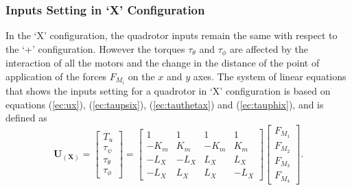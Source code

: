 \subsubsection{Inputs Setting in `X' Configuration}
In the `X' configuration, the quadrotor inputs remain the same with respect to the `+' configuration. However the torques $\tau_\theta$ and $\tau_\phi$ are affected by the interaction of all the motors and the change in the distance of the point of application of the forces $F_{M_i}$ on the $x$ and $y$ axes. The system of linear equations that shows the inputs setting for a quadrotor in `X' configuration is based on equations (\ref{ec:ux}), (\ref{ec:taupsix}), (\ref{ec:tauthetax}) and (\ref{ec:tauphix}), and is defined as
\begin{equation}
	\mathbf{U_{(X)}} = \begin{bmatrix}
	T_u\\[5pt]
	\tau_{\psi}\\[5pt]
	\tau_{\theta}\\[5pt]
	\tau_{\phi}
	\end{bmatrix} = \begin{bmatrix}
	1 & 1 & 1 & 1 \\[5pt]
	-K_{m} & K_{m} & -K_{m} & K_{m}\\[5pt]
	-L_{X} & -L_{X} & L_{X} & L_{X}\\[5pt]
	-L_{X} & L_{X} & L_{X} & -L_{X}
							\end{bmatrix}
\begin{bmatrix}
F_{M_1}\\[5pt]
F_{M_2}\\[5pt]
F_{M_3}\\[5pt]
F_{M_4}
\end{bmatrix}.
	\label{ec:U_X}						
\end{equation}

